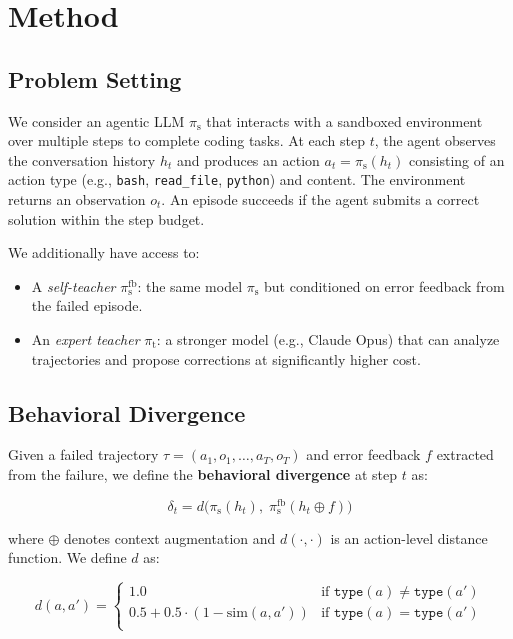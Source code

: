 \documentclass[11pt]{article}
\newcommand{\student}{\pi_{\text{s}}}
\newcommand{\teacher}{\pi_{\text{t}}}
\newcommand{\selfteacher}{\pi_{\text{s}}^{\text{fb}}}
\newcommand{\divergence}{\delta}
\begin{document}
\section{Method}
\label{sec:method}

\subsection{Problem Setting}

We consider an agentic LLM $\student$ that interacts with a sandboxed environment over multiple steps to complete coding tasks. At each step $t$, the agent observes the conversation history $h_t$ and produces an action $a_t = \student(h_t)$ consisting of an action type (e.g., \texttt{bash}, \texttt{read\_file}, \texttt{python}) and content. The environment returns an observation $o_t$. An episode succeeds if the agent submits a correct solution within the step budget.

We additionally have access to:
\begin{itemize}
    \item A \emph{self-teacher} $\selfteacher$: the same model $\student$ but conditioned on error feedback from the failed episode.
    \item An \emph{expert teacher} $\teacher$: a stronger model (e.g., Claude Opus) that can analyze trajectories and propose corrections at significantly higher cost.
\end{itemize}

\subsection{Behavioral Divergence}

Given a failed trajectory $\tau = (a_1, o_1, \ldots, a_T, o_T)$ and error feedback $f$ extracted from the failure, we define the \textbf{behavioral divergence} at step $t$ as:

\begin{equation}
    \divergence_t = d\big(\student(h_t),\; \selfteacher(h_t \oplus f)\big)
\end{equation}

where $\oplus$ denotes context augmentation and $d(\cdot, \cdot)$ is an action-level distance function. We define $d$ as:

\begin{equation}
    d(a, a') = \begin{cases}
        1.0 & \text{if } \texttt{type}(a) \neq \texttt{type}(a') \\
        0.5 + 0.5 \cdot (1 - \text{sim}(a, a')) & \text{if } \texttt{type}(a) = \texttt{type}(a') \\
    \end{cases}
\end{equation}
\end{document}
